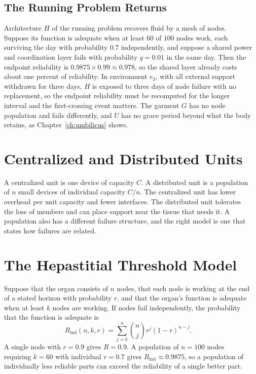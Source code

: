\documentclass[11pt,openany]{book}
\theoremstyle{definition}
\theoremstyle{remark}
\begin{document}
\subsection*{The Running Problem Returns}

Architecture $H$ of the running problem recovers fluid by a mesh of nodes. Suppose its function is adequate when at least $60$ of $100$ nodes work, each surviving the day with probability $0.7$ independently, and suppose a shared power and coordination layer fails with probability $q=0.01$ in the same day. Then the endpoint reliability is $0.9875\times0.99\approx0.978$, so the shared layer already costs about one percent of reliability. In environment $e_3$, with all external support withdrawn for three days, $H$ is exposed to three days of node failure with no replacement, so the endpoint reliability must be recomputed for the longer interval and the first-crossing event matters. The garment $G$ has no node population and fails differently, and $U$ has no grace period beyond what the body retains, as Chapter~\ref{ch:umbilicus} shows.

\section{Centralized and Distributed Units}

A centralized unit is one device of capacity $C$. A distributed unit is a population of $n$ small devices of individual capacity $C/n$. The centralized unit has lower overhead per unit capacity and fewer interfaces. The distributed unit tolerates the loss of members and can place support near the tissue that needs it. A population also has a different failure structure, and the right model is one that states how failures are related.

\section{The Hepastitial Threshold Model}

Suppose that the organ consists of $n$ nodes, that each node is working at the end of a stated horizon with probability $r$, and that the organ's function is adequate when at least $k$ nodes are working. If nodes fail independently, the probability that the function is adequate is
\begin{equation}
R_{\mathrm{ind}}(n,k,r)=\sum_{j=k}^{n}\binom{n}{j}r^{j}(1-r)^{n-j}.
\label{eq:kofn}
\end{equation}
A single node with $r=0.9$ gives $R=0.9$. A population of $n=100$ nodes requiring $k=60$ with individual $r=0.7$ gives $R_{\mathrm{ind}}\approx0.9875$, so a population of individually less reliable parts can exceed the reliability of a single better part.
\end{document}
